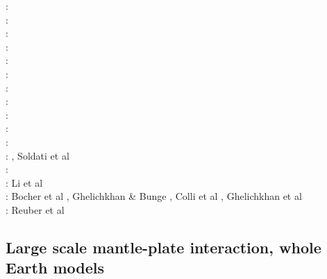 \begin{scriptsize}
\nineteenninetyeight: \cite{cava98}\\
\nineteenninetynine: \cite{samb99}\cite{samb99b}\\
\twothousandone: \cite{bomo01}\cite{kapo01}\\
\twothousandtwo: \cite{shri02}\cite{burb02}\\
\twothousandthree: \cite{buht03}\\
\twothousandfour: \cite{isst04}\\
\twothousandseven: \cite{isks07}\\
\twothousandeight: \cite{splg08}\cite{ligu08}\\
\twothousandnine: \cite{wama09}\cite{splg09}\cite{sifg09}\\
\twothousandtwelve: \cite{naco12}\\
\twothousandfourteen: \cite{wosp14}\cite{hobo14}\cite{licl14}\\
\twothousandfifteen: \cite{wahg15}\cite{cobs15}\cite{vybu15}, Soldati et al \cite{sobd15}\\
\twothousandsixteen: \cite{ghbu16}\cite{bocf16}\cite{yagu16}\cite{baum16}\cite{pric16}\\
\twothousandseventeen: Li et al \cite{ligs17}\\
\twothousandeighteen: Bocher et al \cite{bofc18}, Ghelichkhan \& Bunge \cite{ghbu18}, Colli et al \cite{cogb18}, Ghelichkhan et al \cite{ghmc18}\\
\twothousandtwenty: Reuber et al \cite{rehp20}
\end{scriptsize}

\subsection{Large scale mantle-plate interaction, whole Earth models}

\begin{scriptsize}
\cite{yufl85}
\cite{loja95}
\cite{coli06}
\cite{wamg10}\cite{golw00}\cite{stgb10}\cite{cobe10}
\cite{algs12}\cite{roct12}\cite{crtm12}
\cite{ghbh13}\cite{yahb13}
\cite{macs16}
\cite{hulz18}\cite{osss18b}
\end{scriptsize}

